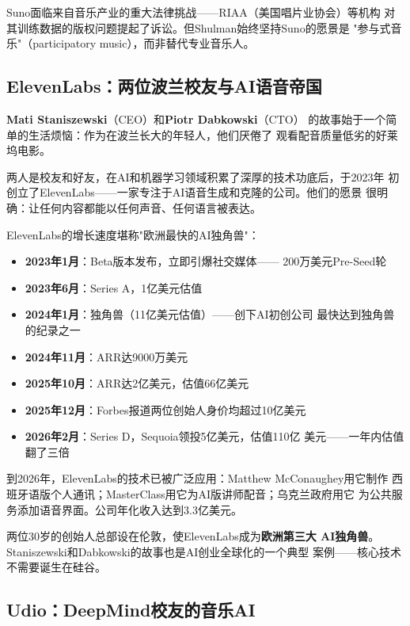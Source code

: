 Suno面临来自音乐产业的重大法律挑战——RIAA（美国唱片业协会）等机构
对其训练数据的版权问题提起了诉讼。但Shulman始终坚持Suno的愿景是
"参与式音乐"（participatory music），而非替代专业音乐人。

\subsection{ElevenLabs：两位波兰校友与AI语音帝国}
\label{subsec:founders-elevenlabs}

\textbf{Mati Staniszewski}（CEO）和\textbf{Piotr Dabkowski}（CTO）
的故事始于一个简单的生活烦恼：作为在波兰长大的年轻人，他们厌倦了
观看配音质量低劣的好莱坞电影。

两人是校友和好友，在AI和机器学习领域积累了深厚的技术功底后，于2023年
初创立了ElevenLabs——一家专注于AI语音生成和克隆的公司。他们的愿景
很明确：让任何内容都能以任何声音、任何语言被表达。

ElevenLabs的增长速度堪称"欧洲最快的AI独角兽"：

\begin{itemize}
  \item \textbf{2023年1月}：Beta版本发布，立即引爆社交媒体——
    200万美元Pre-Seed轮
  \item \textbf{2023年6月}：Series A，1亿美元估值
  \item \textbf{2024年1月}：独角兽（11亿美元估值）——创下AI初创公司
    最快达到独角兽的纪录之一
  \item \textbf{2024年11月}：ARR达9000万美元
  \item \textbf{2025年10月}：ARR达2亿美元，估值66亿美元
  \item \textbf{2025年12月}：Forbes报道两位创始人身价均超过10亿美元
  \item \textbf{2026年2月}：Series D，Sequoia领投5亿美元，估值110亿
    美元——一年内估值翻了三倍
\end{itemize}

到2026年，ElevenLabs的技术已被广泛应用：Matthew McConaughey用它制作
西班牙语版个人通讯；MasterClass用它为AI版讲师配音；乌克兰政府用它
为公共服务添加语音界面。公司年化收入达到3.3亿美元。

两位30岁的创始人总部设在伦敦，使ElevenLabs成为\textbf{欧洲第三大
AI独角兽}。Staniszewski和Dabkowski的故事也是AI创业全球化的一个典型
案例——核心技术不需要诞生在硅谷。

\subsection{Udio：DeepMind校友的音乐AI}
\label{subsec:founders-udio}

